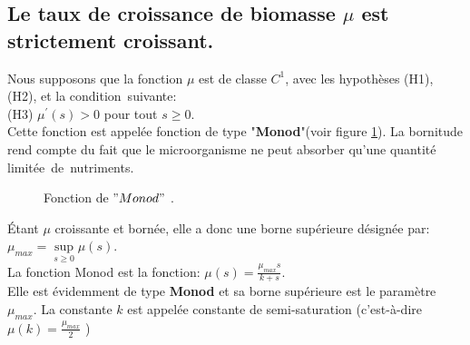 \documentclass[12pt,a4paper]{report}%
\begin{document}
\subsection{Le taux de croissance de biomasse $\mu$ est strictement croissant.}
Nous supposons que la fonction $\mu$ est de classe $C^1$, avec les hypothèses (H1), (H2), et la condition suivante:\\
(H3) $\mu^{\prime}(s) > 0$ pour tout  $s\geqslant 0$.\\
Cette fonction est appelée fonction de type "{\bf Monod}"(voir figure \ref{Gmonod}). La bornitude rend compte du fait que le microorganisme ne peut absorber qu'une quantité limitée de nutriments.
\begin{figure}[htbp]
  \centering
{}
  \caption{Fonction de $" Monod "$ .}
  \label{Gmonod}
\end{figure}
Étant $\mu$ croissante et bornée, elle a donc une borne supérieure désignée par: $\mu_{max}=\sup\limits_{s\geq 0}\mu(s)$.\\
La fonction Monod est la fonction: $\mu(s)=\frac{\mu_{max} s}{k+s}$.\\
Elle est évidemment de type {\bf  Monod } et sa borne supérieure est le paramètre $\mu_{max}$. La constante $k$ est appelée constante de  semi-saturation (c'est-à-dire $\mu(k)=\frac{\mu_{max}}{2}$ )
\end{document}

